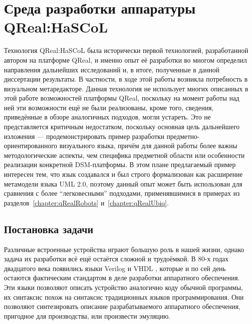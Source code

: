 \section{Среда разработки аппаратуры QReal:HaSCoL}
Технология QReal:HaSCoL была исторически первой технологией, разработанной автором 
на платформе QReal, и именно опыт её разработки во многом определил направления дальнейших 
исследований и, в итоге, полученные в данной диссертации результаты. В частности, 
в ходе этой работы возникла потребность в визуальном метаредакторе. Данная технология 
не использует многих описанных в этой работе возможностей платформы QReal, поскольку 
на момент работы над ней эти возможности ещё не были реализованы, кроме того, сведения, 
приведённые в обзоре аналогичных подходов, могли устареть. Это не представляется критичным 
недостатком, поскольку основная цель дальнейшего изложения --- продемонстрировать 
пример разработки предметно-ориентированного визуального языка, причём для данной 
работы более важны методологические аспекты, чем специфика предметной области или особенности реализации конкретной DSM-платформы. 
В этом плане предлагаемый пример интересен тем, что язык создавался и был строго формализован как расширение метамодели 
языка UML 2.0, поэтому данный опыт может быть использован для сравнения с более "`легковесными"' 
подходами, применявшимися в примерах из разделов~\ref{chapter:qRealRobots} и~\ref{chapter:qRealUbiq}.

\subsection{Постановка задачи}
Различные встроенные устройства играют большую роль в нашей жизни, однако задача их 
разработки всё ещё остаётся сложной и трудоёмкой. В 80-х годах двадцатого века появились языки Verilog и VHDL
, которые и по сей день остаются фактическим стандартом в деле разработки аппаратного 
обеспечения. Эти языки позволяют описать устройство аналогично коду обычной программы, 
их синтаксис похож на синтаксис традиционных языков программирования. Они позволяют 
синтезировать описание разрабатываемого аппаратного обеспечения, пригодное для производства, 
или произвести эмуляцию.

